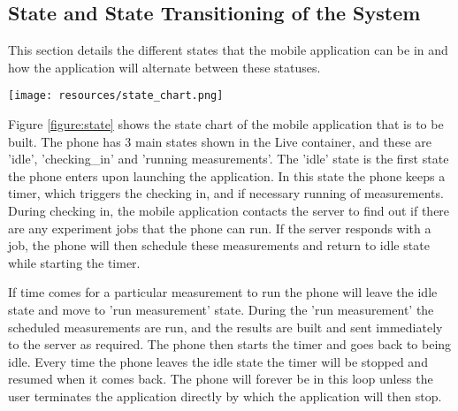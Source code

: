 \subsection{State and State Transitioning of the System}\label{subsec:state-and-state-transitioning-of-the-system}
This section details the different states that the mobile application can be in and how the application will alternate between these statuses.
\begin{figure*}
    \begin{center}
        \texttt{[image: resources/state\_chart.png]}
    \end{center}
    \caption{Showing State Machine Chart for the mobile application that we will be building}
    \label{figure:state}
\end{figure*}
Figure \ref{figure:state}  shows the state chart of the mobile application that is to be built.
The phone has 3 main states shown in the Live container, and these are 'idle', 'checking_in' and 'running measurements'.
The 'idle' state is the first state the phone enters upon launching the application.
In this state the phone keeps a timer, which triggers the checking in, and if necessary running of measurements.
During checking in, the mobile application contacts the server to find out if there are any experiment jobs that the phone can run.
If the server responds with a job, the phone will then schedule these measurements and return to idle state while starting the timer.

If time comes for a particular measurement to run the phone will leave the idle state and move to 'run measurement' state.
During the 'run measurement' the scheduled measurements are run, and the results are built and sent immediately to the server as required.
The phone then starts the timer and goes back to being idle.
Every time the phone leaves the idle state the timer will be stopped and resumed when it comes back.
The phone will forever be in this loop unless the user terminates the application directly by which the application will then stop.
